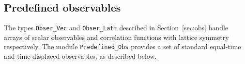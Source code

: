 %
\subsection{Predefined observables} \label{sec:predefined_observales}

The types \texttt{Obser\_Vec} and \texttt{Obser\_Latt} described in Section~\ref{sec:obs} handle arrays of scalar observables and correlation functions with lattice symmetry respectively.
The module \texttt{Predefined\_Obs} provides a set of standard equal-time and time-displaced observables, as described below.

